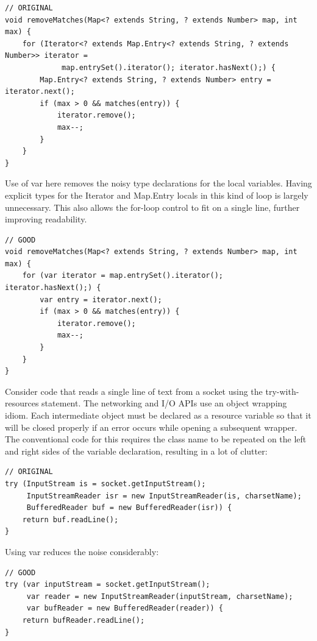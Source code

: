\documentclass[11pt,a4paper, titlepage, parskip=half, headsepline, footsepline, cleardoublepage=current, headheight=1cm]{scrbook}
\begin{document}
\begin{lstlisting}
// ORIGINAL
void removeMatches(Map<? extends String, ? extends Number> map, int max) {
    for (Iterator<? extends Map.Entry<? extends String, ? extends Number>> iterator =
             map.entrySet().iterator(); iterator.hasNext();) {
        Map.Entry<? extends String, ? extends Number> entry = iterator.next();
        if (max > 0 && matches(entry)) {
            iterator.remove();
            max--;
        }
    }
}
\end{lstlisting}
Use of var here removes the noisy type declarations for the local variables. Having explicit types for the Iterator and Map.Entry locals in this kind of loop is largely unnecessary. This also allows the for-loop control to fit on a single line, further improving readability.

\begin{lstlisting}
// GOOD
void removeMatches(Map<? extends String, ? extends Number> map, int max) {
    for (var iterator = map.entrySet().iterator(); iterator.hasNext();) {
        var entry = iterator.next();
        if (max > 0 && matches(entry)) {
            iterator.remove();
            max--;
        }
    }
}
\end{lstlisting}

Consider code that reads a single line of text from a socket using the try-with-resources statement. The networking and I/O APIs use an object wrapping idiom. Each intermediate object must be declared as a resource variable so that it will be closed properly if an error occurs while opening a subsequent wrapper. The conventional code for this requires the class name to be repeated on the left and right sides of the variable declaration, resulting in a lot of clutter:

\begin{lstlisting}
// ORIGINAL
try (InputStream is = socket.getInputStream();
     InputStreamReader isr = new InputStreamReader(is, charsetName);
     BufferedReader buf = new BufferedReader(isr)) {
    return buf.readLine();
}
\end{lstlisting}
Using var reduces the noise considerably:

\begin{lstlisting}
// GOOD
try (var inputStream = socket.getInputStream();
     var reader = new InputStreamReader(inputStream, charsetName);
     var bufReader = new BufferedReader(reader)) {
    return bufReader.readLine();
}
\end{lstlisting}
\end{document}
